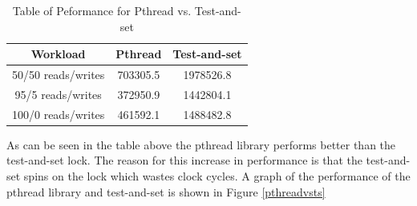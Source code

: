 \documentclass{article}
\begin{document}
\begin{center}
\begin{table}[h]
\begin{tabular}{|ccc|} 
\hline
Workload & Pthread & Test-and-set\\
\hline
50/50 reads/writes & 703305.5 & 1978526.8\\
95/5 reads/writes & 372950.9 & 1442804.1\\
100/0 reads/writes & 461592.1 & 1488482.8\\
\hline
\end{tabular}
\caption{Table of Peformance for Pthread vs. Test-and-set}
\label{table:comp}
\end{table}
\end{center}

As can be seen in the table above the pthread library performs better than the test-and-set lock.
The reason for this increase in performance is that the test-and-set spins on the lock which wastes clock cycles.
A graph of the performance of the pthread library and test-and-set is shown in Figure \ref{pthreadvsts}
\end{document}
